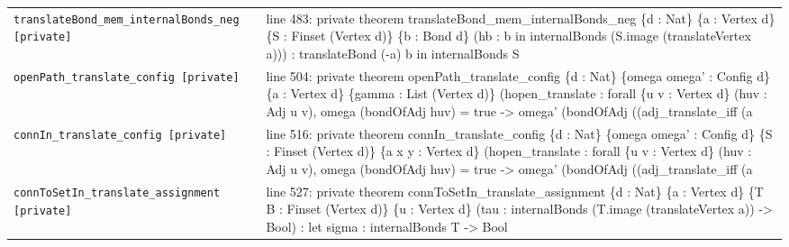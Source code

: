 \documentclass[10pt]{article}
\begin{document}
\begin{longtable}{>{\raggedright\arraybackslash}p{} >{\raggedright\arraybackslash}p{}}
\texttt{translateBond\_\allowbreak{}mem\_\allowbreak{}internalBonds\_\allowbreak{}neg [private]} & {\ttfamily\scriptsize line 483:\allowbreak{} private theorem translateBond\_\allowbreak{}mem\_\allowbreak{}internalBonds\_\allowbreak{}neg \{d :\allowbreak{} Nat\} \{a :\allowbreak{} Vertex d\} \{S :\allowbreak{} Finset (\allowbreak{}Vertex d)\allowbreak{}\} \{b :\allowbreak{} Bond d\} (\allowbreak{}hb :\allowbreak{} b in internalBonds (\allowbreak{}S.\allowbreak{}image (\allowbreak{}translateVertex a)\allowbreak{})\allowbreak{})\allowbreak{} :\allowbreak{} translateBond (\allowbreak{}-\allowbreak{}a)\allowbreak{} b in internalBonds S} \\[0.45em]
\texttt{openPath\_\allowbreak{}translate\_\allowbreak{}config [private]} & {\ttfamily\scriptsize line 504:\allowbreak{} private theorem openPath\_\allowbreak{}translate\_\allowbreak{}config \{d :\allowbreak{} Nat\} \{omega omega' :\allowbreak{} Config d\} \{a :\allowbreak{} Vertex d\} \{gamma :\allowbreak{} List (\allowbreak{}Vertex d)\allowbreak{}\} (\allowbreak{}hopen\_\allowbreak{}translate :\allowbreak{} forall \{u v :\allowbreak{} Vertex d\} (\allowbreak{}huv :\allowbreak{} Adj u v)\allowbreak{},\allowbreak{} omega (\allowbreak{}bondOfAdj huv)\allowbreak{} =\allowbreak{} true -\allowbreak{}> omega' (\allowbreak{}bondOfAdj (\allowbreak{}(\allowbreak{}adj\_\allowbreak{}translate\_\allowbreak{}iff (\allowbreak{}a} \\[0.45em]
\texttt{connIn\_\allowbreak{}translate\_\allowbreak{}config [private]} & {\ttfamily\scriptsize line 516:\allowbreak{} private theorem connIn\_\allowbreak{}translate\_\allowbreak{}config \{d :\allowbreak{} Nat\} \{omega omega' :\allowbreak{} Config d\} \{S :\allowbreak{} Finset (\allowbreak{}Vertex d)\allowbreak{}\} \{a x y :\allowbreak{} Vertex d\} (\allowbreak{}hopen\_\allowbreak{}translate :\allowbreak{} forall \{u v :\allowbreak{} Vertex d\} (\allowbreak{}huv :\allowbreak{} Adj u v)\allowbreak{},\allowbreak{} omega (\allowbreak{}bondOfAdj huv)\allowbreak{} =\allowbreak{} true -\allowbreak{}> omega' (\allowbreak{}bondOfAdj (\allowbreak{}(\allowbreak{}adj\_\allowbreak{}translate\_\allowbreak{}iff (\allowbreak{}a} \\[0.45em]
\texttt{connToSetIn\_\allowbreak{}translate\_\allowbreak{}assignment [private]} & {\ttfamily\scriptsize line 527:\allowbreak{} private theorem connToSetIn\_\allowbreak{}translate\_\allowbreak{}assignment \{d :\allowbreak{} Nat\} \{a :\allowbreak{} Vertex d\} \{T B :\allowbreak{} Finset (\allowbreak{}Vertex d)\allowbreak{}\} \{u :\allowbreak{} Vertex d\} (\allowbreak{}tau :\allowbreak{} internalBonds (\allowbreak{}T.\allowbreak{}image (\allowbreak{}translateVertex a)\allowbreak{})\allowbreak{} -\allowbreak{}> Bool)\allowbreak{} :\allowbreak{} let sigma :\allowbreak{} internalBonds T -\allowbreak{}> Bool} \\[0.45em]

\end{longtable}
\end{document}
